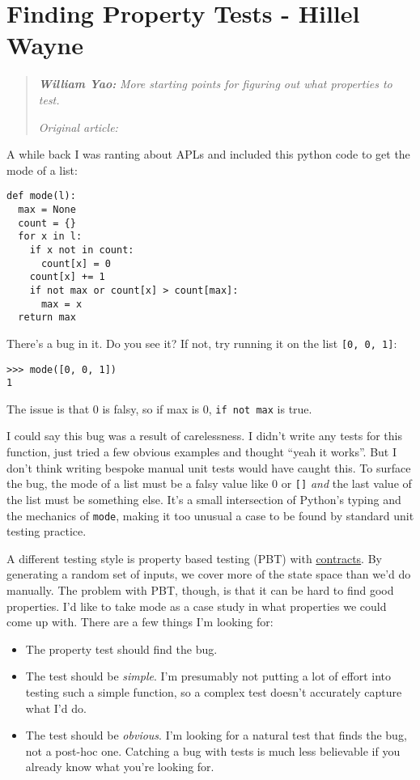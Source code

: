 \chapter{Finding Property Tests - Hillel Wayne}
\label{sec:finding_property_tests}

\begin{quotation}
\noindent\textit{\textbf{William Yao:}}
\textit{More starting points for figuring out what properties to test.}

\vspace{\baselineskip}
\noindent\textit{Original article: \cite{finding_properties}}
\end{quotation}

A while back I was ranting about APLs and included this python code to
get the mode of a list:

\begin{verbatim}
def mode(l):
  max = None
  count = {}
  for x in l:
    if x not in count:
      count[x] = 0
    count[x] += 1
    if not max or count[x] > count[max]:
      max = x
  return max
\end{verbatim}
There's a bug in it. Do you see it? If not, try running it on the list
\texttt{{[}0,\ 0,\ 1{]}}:

\begin{verbatim}
>>> mode([0, 0, 1])
1
\end{verbatim}
The issue is that 0 is falsy, so if max is 0, \texttt{if\ not\ max} is
true.

I could say this bug was a result of carelessness. I didn't write any
tests for this function, just tried a few obvious examples and thought
``yeah it works''. But I don't think writing bespoke manual unit tests
would have caught this. To surface the bug, the mode of a list must be a
falsy value like 0 or \texttt{{[}{]}} \emph{and} the last value of the
list must be something else. It's a small intersection of Python's
typing and the mechanics of \texttt{mode}, making it too unusual a case
to be found by standard unit testing practice.

A different testing style is property based testing (PBT) with
\href{https://www.hillelwayne.com/post/contracts/}{contracts}. By
generating a random set of inputs, we cover more of the state space than
we'd do manually. The problem with PBT, though, is that it can be hard
to find good properties. I'd like to take mode as a case study in what
properties we could come up with.
There are a few things I'm looking for:

\begin{itemize}

\item
  The property test should find the bug.
\item
  The test should be \emph{simple}. I'm presumably not putting a lot of
  effort into testing such a simple function, so a complex test doesn't
  accurately capture what I'd do.
\item
  The test should be \emph{obvious}. I'm looking for a natural test that
  finds the bug, not a post-hoc one. Catching a bug with tests is much
  less believable if you already know what you're looking for.
\end{itemize}

